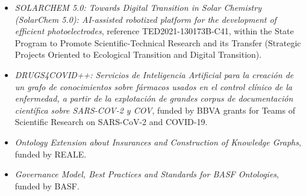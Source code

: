 \begin{itemize}
    \item \textit{SOLARCHEM 5.0: Towards Digital Transition in Solar Chemistry (SolarChem 5.0): AI-assisted robotized platform for the development of efficient photoelectrodes}, reference TED2021-130173B-C41, within the State Program to Promote Scientific-Technical Research and its Transfer (Strategic Projects Oriented to Ecological Transition and Digital Transition).

    \item \textit{DRUGS4COVID++: Servicios de Inteligencia Artificial para la creación de un grafo de conocimientos sobre fármacos usados en el control clínico de la enfermedad, a partir de la explotación de grandes corpus de documentación científica sobre SARS-COV-2 y COV}, funded by BBVA grants for Teams of Scientific Research on SARS-CoV-2 and COVID-19.

    \item \textit{Ontology Extension about Insurances and Construction of Knowledge Graphs}, funded by REALE. 
    
    \item \textit{Governance Model, Best Practices and Standards for BASF Ontologies}, funded by BASF. 
\end{itemize}